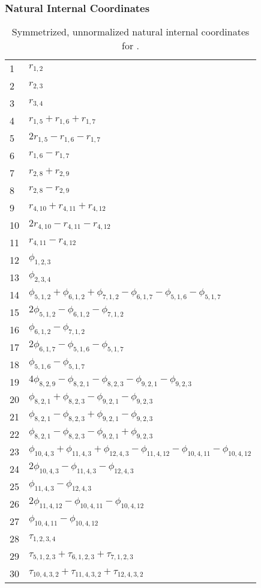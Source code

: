 \documentclass[10pt,oneside]{article}
\begin{document}
\subsubsection*{Natural Internal Coordinates}
\begin{table}[h!]
\centering
\caption{Symmetrized, unnormalized natural internal coordinates for .}
\small
\begin{tabular}{ll}
  1   & $r_{1,2}$ \\
  2   & $r_{2,3}$ \\
  3   & $r_{3,4}$ \\
  4   & $r_{1,5} + r_{1,6} + r_{1,7}$ \\
  5   & $2r_{1,5} - r_{1,6} - r_{1,7}$ \\
  6   & $r_{1,6} - r_{1,7}$ \\
  7   & $r_{2,8} + r_{2,9}$ \\
  8   & $r_{2,8} - r_{2,9}$ \\
  9   & $r_{4,10} + r_{4,11} + r_{4,12}$ \\
  10  & $2r_{4,10} - r_{4,11} - r_{4,12}$ \\
  11  & $r_{4,11} - r_{4,12}$ \\
  12  & $\phi_{1,2,3}$ \\
  13  & $\phi_{2,3,4}$ \\
  14  & $\phi_{5,1,2} + \phi_{6,1,2} + \phi_{7,1,2} - \phi_{6,1,7} - \phi_{5,1,6} - \phi_{5,1,7}$ \\
  15  & $2\phi_{5,1,2} - \phi_{6,1,2} - \phi_{7,1,2}$ \\
  16  & $\phi_{6,1,2} - \phi_{7,1,2}$ \\
  17  & $2\phi_{6,1,7} - \phi_{5,1,6} - \phi_{5,1,7}$ \\
  18  & $\phi_{5,1,6} - \phi_{5,1,7}$ \\
  19  & $4\phi_{8,2,9} - \phi_{8,2,1} - \phi_{8,2,3} - \phi_{9,2,1} - \phi_{9,2,3}$ \\
  20  & $\phi_{8,2,1} + \phi_{8,2,3} - \phi_{9,2,1} - \phi_{9,2,3}$ \\
  21  & $\phi_{8,2,1} - \phi_{8,2,3} + \phi_{9,2,1} - \phi_{9,2,3}$ \\
  22  & $\phi_{8,2,1} - \phi_{8,2,3} - \phi_{9,2,1} + \phi_{9,2,3}$ \\
  23  & $\phi_{10,4,3} + \phi_{11,4,3} + \phi_{12,4,3} - \phi_{11,4,12} - \phi_{10,4,11} - \phi_{10,4,12}$ \\
  24  & $2\phi_{10,4,3} - \phi_{11,4,3} - \phi_{12,4,3}$ \\
  25  & $\phi_{11,4,3} - \phi_{12,4,3}$ \\
  26  & $2\phi_{11,4,12} - \phi_{10,4,11} - \phi_{10,4,12}$ \\
  27  & $\phi_{10,4,11} - \phi_{10,4,12}$ \\
  28  & $\tau_{1,2,3,4}$ \\
  29  & $\tau_{5,1,2,3} + \tau_{6,1,2,3} + \tau_{7,1,2,3}$ \\
  30  & $\tau_{10,4,3,2} + \tau_{11,4,3,2} + \tau_{12,4,3,2}$ \\
\end{tabular}
\end{table}
\end{document}
